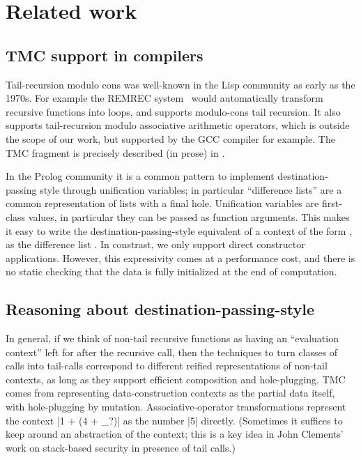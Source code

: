 \section{Related work}

\subsection{TMC support in compilers}

Tail-recursion modulo cons was well-known in the Lisp community as
early as the 1970s. For example the REMREC system~\citep*{risch-73}
would automatically transform recursive functions into loops, and
supports modulo-cons tail recursion. It also supports tail-recursion
modulo associative arithmetic operators, which is outside the scope
of our work, but supported by the GCC compiler for example. The TMC
fragment is precisely described (in prose) in \citet*{friedman-wise-75}.

In the Prolog community it is a common pattern to implement
destination-passing style through unification variables; in particular
``difference lists'' are a common representation of lists with a final
hole. Unification variables are first-class values, in particular they
can be passed as function arguments. This makes it easy to write the
destination-passing-style equivalent of a context of the form
, as the difference list
. In constrast, we only support direct
constructor applications. However, this expressivity comes at
a performance cost, and there is no static checking that the data is
fully initialized at the end of computation.

\subsection{Reasoning about destination-passing-style}

In general, if we think of non-tail recursive functions as having an
``evaluation context'' left for after the recursive call, then the
techniques to turn classes of calls into tail-calls correspond to
different reified representations of non-tail contexts, as long as
they support efficient composition and hole-plugging. TMC comes from
representing data-construction contexts as the partial data itself,
with hole-plugging by mutation. Associative-operator transformations
represent the context \ocaml|1 + (4 + _?)| as the number \ocaml|5|
directly. (Sometimes it suffices to keep around an abstraction of the
context; this is a key idea in John Clements' work on stack-based
security in presence of tail calls.)

